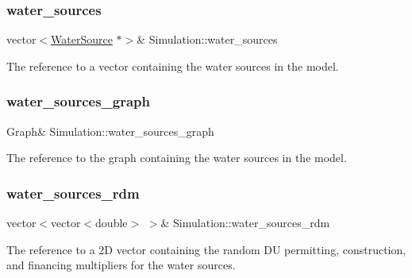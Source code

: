 \subsubsection{\texorpdfstring{water\+\_\+sources}{water\_sources}}
{\footnotesize\ttfamily vector$<$\mbox{\hyperlink{classWaterSource}{Water\+Source}} $\ast$$>$\& Simulation\+::water\+\_\+sources\hspace{0.3cm}{\ttfamily [private]}}



The reference to a vector containing the water sources in the model. 

\mbox{\label{classSimulation_a04d4514b77ae98ec66cb8c2d633b2a52}} 
\subsubsection{\texorpdfstring{water\+\_\+sources\+\_\+graph}{water\_sources\_graph}}
{\footnotesize\ttfamily Graph\& Simulation\+::water\+\_\+sources\+\_\+graph\hspace{0.3cm}{\ttfamily [private]}}



The reference to the graph containing the water sources in the model. 

\mbox{\label{classSimulation_afd35d5f1a11036d7c64668274ba0cc20}} 
\subsubsection{\texorpdfstring{water\+\_\+sources\+\_\+rdm}{water\_sources\_rdm}}
{\footnotesize\ttfamily vector$<$vector$<$double$>$ $>$\& Simulation\+::water\+\_\+sources\+\_\+rdm\hspace{0.3cm}{\ttfamily [private]}}



The reference to a 2D vector containing the random DU permitting, construction, and financing multipliers for the water sources. 

\mbox{\label{classSimulation_ab2825b5561679583c89a3936ce7dea39}} 
